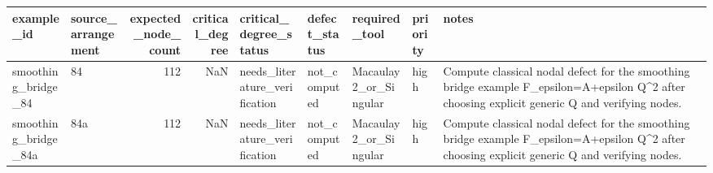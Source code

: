 \begin{tabular}{llrrlllll}
\toprule
example_id & source_arrangement & expected_node_count & critical_degree & critical_degree_status & defect_status & required_tool & priority & notes \\
\midrule
smoothing_bridge_84 & 84 & 112 & NaN & needs_literature_verification & not_computed & Macaulay2_or_Singular & high & Compute classical nodal defect for the smoothing bridge example F_epsilon=A+epsilon Q^2 after choosing explicit generic Q and verifying nodes. \\
smoothing_bridge_84a & 84a & 112 & NaN & needs_literature_verification & not_computed & Macaulay2_or_Singular & high & Compute classical nodal defect for the smoothing bridge example F_epsilon=A+epsilon Q^2 after choosing explicit generic Q and verifying nodes. \\
\bottomrule
\end{tabular}
